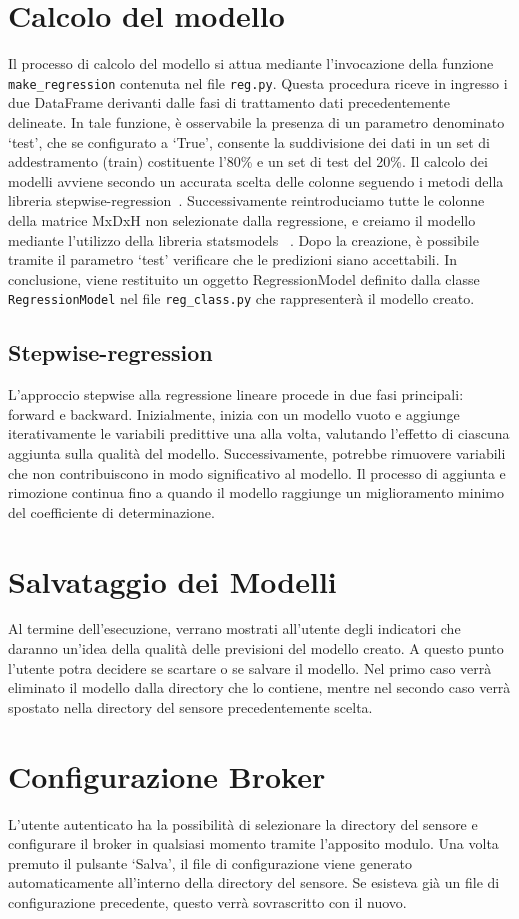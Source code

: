 \documentclass{rapportECL}
\begin{document}
\section{Calcolo del modello}
Il processo di calcolo del modello si attua mediante l'invocazione della funzione \texttt{make\_regression} contenuta nel file \texttt{reg.py}. 
Questa procedura riceve in ingresso i due DataFrame derivanti dalle fasi di trattamento dati precedentemente delineate. 
In tale funzione, è osservabile la presenza di un parametro denominato `test', che se configurato a `True', 
consente la suddivisione dei dati in un set di addestramento (train) costituente l'80\% e un set di test del 20\%.  Il calcolo dei modelli
avviene secondo un accurata scelta delle colonne seguendo i metodi della libreria stepwise-regression~\cite{stepwise-regression}. 
Successivamente reintroduciamo tutte le colonne della matrice MxDxH non selezionate dalla regressione, e creiamo il modello mediante l'utilizzo della libreria statsmodels
~\cite{statsmodels}. 
Dopo la creazione, è possibile tramite il parametro `test' verificare che le predizioni siano accettabili. In conclusione, viene restituito un oggetto RegressionModel definito 
dalla classe \texttt{RegressionModel} nel file \texttt{reg\_class.py} che rappresenterà il modello creato.

\subsection{Stepwise-regression}
L'approccio stepwise alla regressione lineare procede in due fasi principali: forward e backward. Inizialmente, inizia con un modello vuoto e 
aggiunge iterativamente le variabili predittive una alla volta, valutando l'effetto di ciascuna aggiunta sulla qualità del modello. 
Successivamente, potrebbe rimuovere variabili che non contribuiscono in modo significativo al modello.
Il processo di aggiunta e rimozione continua fino a quando il modello raggiunge un miglioramento minimo del coefficiente di determinazione.


\section{Salvataggio dei Modelli}
Al termine dell'esecuzione, verrano mostrati all'utente degli indicatori che daranno un'idea della qualità delle previsioni del modello creato.
A questo punto l'utente potra decidere se scartare o se salvare il modello. Nel primo caso verrà eliminato il modello dalla directory che lo contiene, mentre nel 
secondo caso verrà spostato nella directory del sensore precedentemente scelta.

\section{Configurazione Broker}
L'utente autenticato ha la possibilità di selezionare la directory del sensore e configurare il broker in qualsiasi momento tramite l'apposito modulo. 
Una volta premuto il pulsante `Salva', il file di configurazione viene generato automaticamente all'interno della directory del sensore. 
Se esisteva già un file di configurazione precedente, questo verrà sovrascritto con il nuovo.


\end{document}
